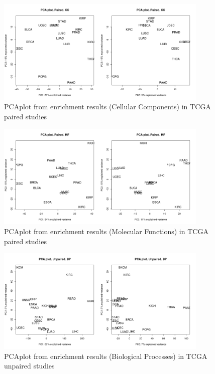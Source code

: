 \documentclass[a4paper,12pt]{article}
\begin{document}
\begin{figure}[!h] 
\centering 
\includegraphics[width=0.9\textwidth]{img/pca_cc_paired.png} 
\caption{PCAplot from enrichment results (Cellular Components) in TCGA paired studies} 
\label{figPCA_cc_paired} 
\end{figure} 

\begin{figure}[!h] 
\centering 
\includegraphics[width=0.9\textwidth]{img/pca_mf_paired.png} 
\caption{PCAplot from enrichment results (Molecular Functions) in TCGA paired studies} 
\label{figPCA_mf_paired} 
\end{figure} 


\begin{figure}[!h] 
\centering 
\includegraphics[width=0.9\textwidth]{img/pca_bp_unpaired.png} 
\caption{PCAplot from enrichment results (Biological Processes) in TCGA unpaired studies} 
\label{figPCA_bp_unpaired} 
\end{figure} 
\end{document}
